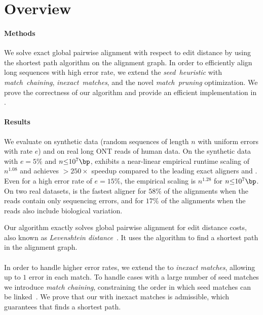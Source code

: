 

\section{Overview}

\paragraph{Methods}
We solve exact global pairwise alignment with respect to edit distance by using
the \A shortest path algorithm on the alignment graph. In order to efficiently
align long sequences with high error rate, we extend the \emph{seed~heuristic}
with \emph{match~chaining}, \emph{inexact~matches}, and the novel
\emph{match~pruning} optimization. We prove the correctness of our algorithm and
provide an efficient implementation in \astarpa.
\paragraph{Results}
We evaluate \astarpa on synthetic data (random sequences of length $n$ with
uniform errors with rate $e$) and on real long ONT reads of human data. On the
synthetic data with $e{=}5\%$ and $n{\leq}10^7\bp$, \astarpa exhibits a
near-linear empirical runtime scaling of $n^{1.08}$ and achieves ${>}250\times$
speedup compared to the leading exact aligners \edlib and \wfa. Even for a high
error rate of $e{=}15\%$, the empirical scaling is $n^{1.28}$ for
$n{\leq}10^7\bp$. On two real datasets, \astarpa is the fastest aligner for
$58\%$ of the alignments when the reads contain only sequencing errors, and for
$17\%$ of the alignments when the reads also include biological variation.

Our algorithm exactly solves global pairwise alignment for edit distance costs,
also known as \emph{Levenshtein distance}~\citep{levenshtein1966binary}. It uses
the \A algorithm to find a shortest path in the alignment graph.

\paragraph{\Sh} In order to handle higher error rates, we extend the \emph{\sh}
to \emph{inexact matches}, allowing up to $1$ error in each match.  To handle
cases with a large number of seed matches we introduce \emph{match chaining},
constraining the order in which seed matches can be
linked~\citep{wilbur1984context,benson2016lcsk}. We prove that our \emph{\csh}
with inexact matches is admissible, which guarantees that \A finds a shortest
path.

